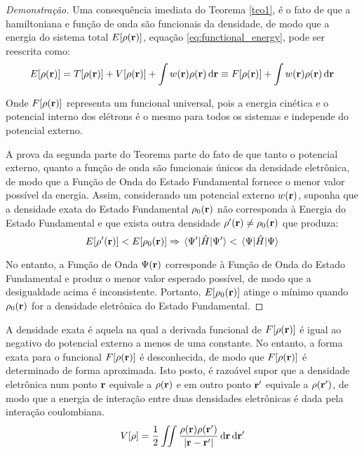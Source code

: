 \begin{proof}[Demonstração]
	
	Uma consequência imediata do Teorema \ref{teo1}, é o fato de que a hamiltoniana e função de onda são funcionais da densidade, de modo que a energia do sistema total $ E\bqty{\dens} $, equação \eqref{eq:functional_energy}, pode ser reescrita como:
	\begin{equation}\label{eq:func_energy-2}
		E\bqty{\dens}= T\bqty{\dens}+ V\bqty{\dens}+\int w(\vb{r})\dens\dr \equiv F\bqty{\dens} +\int w(\vb{r})\dens\dr
	\end{equation}
	
	Onde $  F\bqty{\dens} $ representa um funcional universal, pois a energia cinética e o potencial interno dos elétrons é o mesmo para todos os sistemas e independe do potencial externo. \cite{abc_dft}
	
	A prova da segunda parte do Teorema parte do fato de que tanto o potencial externo, quanto a função de onda são funcionais únicos da densidade eletrônica, de modo que a Função de Onda do Estado Fundamental fornece o menor valor possível da energia. Assim, considerando um potencial externo $ w(\vb{r}) $, suponha que a densidade exata do Estado Fundamental $ \rho_{0}(\vb{r}) $ não corresponda à Energia do Estado Fundamental e que exista outra densidade $ \rho'(\vb{r})\neq \rho_{0}(\vb{r})  $ que produza: 
	\begin{equation}
		E\bqty{\rho'(\vb{r})}< E\bqty{\denzero} \Rightarrow \ev{\hat{H}}{\Psi'}<\ev{\hat{H}}{\Psi}
	\end{equation}
	
	No entanto, a Função de Onda $ \Psi(\vb{r}) $ corresponde à Função de Onda do Estado Fundamental e produz o menor valor esperado possível, de modo que a desigualdade acima é inconsistente. Portanto, $ E\bqty{\denzero} $ atinge o mínimo quando $ \rho_{0}(\vb{r}) $ for a densidade eletrônica do Estado Fundamental. 
\end{proof}

A densidade exata é aquela na qual a derivada funcional de $ F\bqty{\dens} $ é igual ao negativo do potencial externo a menos de uma constante. No entanto, a forma exata para o funcional $ F\bqty{\dens} $ é desconhecida, de modo que $ F\bqty{\dens}  $ é determinado de forma aproximada. Isto posto, é razoável supor que a densidade eletrônica num ponto $ \vb{r} $ equivale a $ \rho(\vb{r}) $ e em outro ponto $ \vb{r'} $ equivale a $ \rho(\vb{r'}) $, de modo que a energia de interação entre duas densidades eletrônicas é dada pela interação coulombiana.
\begin{equation}\label{eq:exp_F_V}
	V\bqty{\rho}=\frac{1}{2}\iint \frac{\dens\rho(\vb{r'})}{\abs{\vb{r}-\vb{r'}}}\dr\dd{\vb{r'}}
\end{equation}

